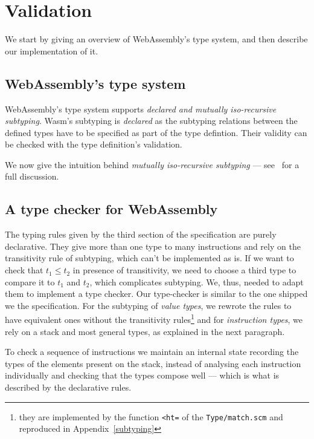 \documentclass[a4paper,11pt]{article}
\begin{document}
\section{Validation}\label{val}
We start by giving an overview of WebAssembly's type system, and then describe
our implementation of it.
\subsection{WebAssembly's type system}

WebAssembly's type system supports \emph{declared and mutually iso-recursive
subtyping}.
Wasm's subtyping is \emph{declared} as the subtyping relations between the
defined types have to be specified as part of the type defintion. Their validity
can be checked with the type definition's validation.

We now give the intuition behind \emph{mutually iso-recursive subtyping} ---
see~\cite{rossberg2023mutually} for a full discussion.
\subsection{A type checker for WebAssembly}
The typing rules given by the third section of the specification are purely
declarative. They give more than one type to many instructions and rely on the
transitivity rule of subtyping, which can't be implemented as is. If we want to
check that $t_1 \leq t_2$ in presence of transitivity, we need to choose a third
type to compare it to $t_1$ and $t_2$, which complicates subtyping. We, thus,
needed to adapt them to implement a type checker. Our type-checker is similar to
the one shipped we the specification. For the subtyping of \emph{value types},
we rewrote the rules to have equivalent ones without the transitivity
rules\footnote{they are implemented by the function \texttt{<ht=} of the
\texttt{Type/match.scm} and reproduced in Appendix~\ref{subtyping}} and for
\emph{instruction types}, we rely on a stack and most general types, as
explained in the next paragraph.

To check a sequence of instructions we maintain an internal state recording the
types of the elements present on the stack, instead of analysing each
instruction individually and checking that the types compose well --- which is
what is described by the declarative rules.
\end{document}
